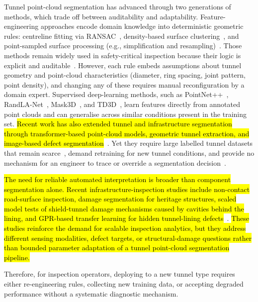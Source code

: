 \documentclass[a4paper,fleqn]{cas-dc}
\begin{document}
Tunnel point-cloud segmentation has advanced through two generations of methods, which trade off between auditability and adaptability. Feature-engineering approaches encode domain knowledge into deterministic geometric rules: centreline fitting via RANSAC~\cite{fischler1981ransac}, density-based surface clustering~\cite{ester1996dbscan}, and point-sampled surface processing (e.g., simplification and resampling)~\cite{pauly2002}. Those methods remain widely used in safety-critical inspection because their logic is explicit and auditable~\cite{weidner2024generalized}. However, each rule embeds assumptions about tunnel geometry and point-cloud characteristics (diameter, ring spacing, joint pattern, point density), and changing any of these requires manual reconfiguration by a domain expert. Supervised deep-learning methods, such as PointNet++~\cite{qi2017pointnet}, RandLA-Net~\cite{hu2020randla}, Mask3D~\cite{schult2023mask3d}, and TD3D~\cite{kolodiazhnyi2024td3d}, learn features directly from annotated point clouds and can generalise across similar conditions present in the training set. \hl{Recent work has also extended tunnel and infrastructure segmentation through transformer-based point-cloud models, geometric tunnel extraction, and image-based defect segmentation}~\cite{wang2026serialformer, wang2025automated, yang2024yologsd, liang2026ecayolo}. Yet they require large labelled tunnel datasets that remain scarce~\cite{su2024review}, demand retraining for new tunnel conditions, and provide no mechanism for an engineer to trace or override a segmentation decision~\cite{cha2024deep}.

\hl{The need for reliable automated interpretation is broader than component segmentation alone. Recent infrastructure-inspection studies include non-contact road-surface inspection, damage segmentation for heritage structures, scaled model tests of shield-tunnel damage mechanisms caused by cavities behind the lining, and GPR-based transfer learning for hidden tunnel-lining defects}~\cite{yue2026road, yue2026dual, yue2024cavity, yue2024gpr}. \hl{These studies reinforce the demand for scalable inspection analytics, but they address different sensing modalities, defect targets, or structural-damage questions rather than bounded parameter adaptation of a tunnel point-cloud segmentation pipeline.}

Therefore, for inspection operators, deploying to a new tunnel type requires either re-engineering rules, collecting new training data, or accepting degraded performance without a systematic diagnostic mechanism.
\end{document}
